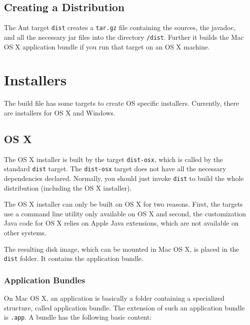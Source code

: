 \documentclass[11pt,a4paper]{article}
\begin{document}
\subsection{Creating a Distribution}
The Ant target \texttt{dist} creates a \texttt{tar.gz} file containing the
sources, the javadoc, and all the necessary jar files into the directory
\texttt{/dist}. Further it builds the Mac OS X application bundle if
you run that target on an OS X machine.



\section{Installers}
The build file has some targets to create OS specific installers. Currently,
there are installers for OS X and Windows.


\subsection{OS X}
The OS X installer is built by the target \texttt{dist-osx}, which is 
called by the standard \texttt{dist} target. The \texttt{dist-osx} target
does not have all the necessary dependencies declared. Normally, you should
just invoke \texttt{dist} to build the whole distribution (including
the OS X installer). 

The OS X installer can only
be built on OS X for two reasons. First, the targets use a command line
utility only available on OS X and second, the customization Java code
for OS X relies on Apple Java extensions, which are not available on
other systems.

The resulting disk image, which can be mounted in Mac OS X, is placed in the \texttt{dist} folder. It contains the application bundle.

\subsubsection{Application Bundles}
On Mac OS X, an application is basically a folder containing a specialized
structure, called application bundle. The extension of such an application
bundle is \texttt{.app}. A bundle has the following basic content:
\end{document}
